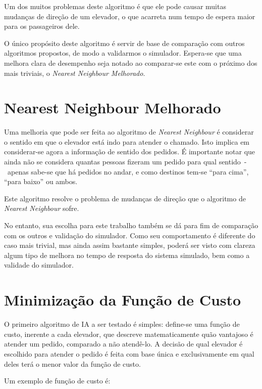 Um dos muitos problemas deste algoritmo é que ele pode causar muitas mudanças de
direção de um elevador, o que acarreta num tempo de espera maior para os
passageiros dele.

O único propósito deste algoritmo é servir de base de comparação com outros
algoritmos propostos, de modo a validarmos o simulador. Espera-se que uma
melhora clara de desempenho seja notado ao comparar-se este com o próximo dos
mais triviais, o \textit{Nearest Neighbour Melhorado}.


\section{\label{sec:ai:nnm}Nearest Neighbour Melhorado}

Uma melhoria que pode ser feita ao algoritmo de \textit{Nearest Neighbour}
é considerar o sentido em que o elevador está indo para atender o chamado. Isto
implica em considerar-se agora a informação de sentido dos pedidos. É importante
notar que ainda não se considera quantas pessoas fizeram um pedido para qual
sentido~-~apenas sabe-se que há pedidos no andar, e como destinos tem-se ``para
cima'', ``para baixo'' ou ambos.

Este algoritmo resolve o problema de mudanças de direção que o algoritmo de
\textit{Nearest Neighbour} sofre.

No entanto, sua escolha para este trabalho também se dá para fim de comparação
com os outros e validação do simulador. Como seu comportamento é diferente do
caso mais trivial, mas ainda assim bastante simples, poderá ser visto com clareza
algum tipo de melhora no tempo de resposta do sistema simulado, bem como a validade do simulador.

\section{\label{sec:ai:minimize-cost-function}Minimização da Função de Custo}

O primeiro algoritmo de IA a ser testado é simples: define-se uma
função de custo, inerente a cada elevador, que descreve matematicamente quão
vantajoso é atender um pedido, comparado a não atendê-lo. A decisão de qual
elevador é escolhido para atender o pedido é feita com base única e
 exclusivamente em qual deles terá o menor valor da função de custo.

Um exemplo de função de custo é:

